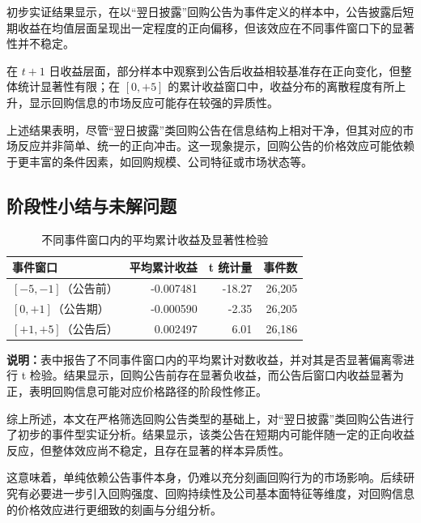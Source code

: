 \documentclass[a4paper,10pt]{article}
\begin{document}
初步实证结果显示，在以“翌日披露”回购公告为事件定义的样本中，公告披露后短期收益在均值层面呈现出一定程度的正向偏移，但该效应在不同事件窗口下的显著性并不稳定。

在 $t+1$ 日收益层面，部分样本中观察到公告后收益相较基准存在正向变化，但整体统计显著性有限；在 $[0,+5]$ 的累计收益窗口中，收益分布的离散程度有所上升，显示回购信息的市场反应可能存在较强的异质性。

上述结果表明，尽管“翌日披露”类回购公告在信息结构上相对干净，但其对应的市场反应并非简单、统一的正向冲击。这一现象提示，回购公告的价格效应可能依赖于更丰富的条件因素，如回购规模、公司特征或市场状态等。


\subsection{阶段性小结与未解问题}

\begin{table}[H]
    \centering
    \caption{不同事件窗口内的平均累计收益及显著性检验}
    \label{tab:event_window_test}
    \renewcommand{\arraystretch}{1.2}
    \begin{tabular}{l r r r}
        \toprule
        \textbf{事件窗口} & 
        \textbf{平均累计收益} & 
        \textbf{t 统计量} & 
        \textbf{事件数} \\
        \midrule
        $[-5,-1]$（公告前） & -0.007481 & -18.27 & 26{,}205 \\
        $[0,+1]$（公告期）  & -0.000590 & -2.35  & 26{,}205 \\
        $[+1,+5]$（公告后） &  0.002497 &  6.01  & 26{,}186 \\
        \bottomrule
    \end{tabular}
    \vspace{0.2cm}
    \begin{flushleft}
        \footnotesize
        \textbf{说明：}表中报告了不同事件窗口内的平均累计对数收益，并对其是否显著偏离零进行 t 检验。结果显示，回购公告前存在显著负收益，而公告后窗口内收益显著为正，表明回购信息可能对应价格路径的阶段性修正。
    \end{flushleft}
\end{table}


综上所述，本文在严格筛选回购公告类型的基础上，对“翌日披露”类回购公告进行了初步的事件型实证分析。结果显示，该类公告在短期内可能伴随一定的正向收益反应，但整体效应尚不稳定，且存在显著的样本异质性。

这意味着，单纯依赖公告事件本身，仍难以充分刻画回购行为的市场影响。后续研究有必要进一步引入回购强度、回购持续性及公司基本面特征等维度，对回购信息的价格效应进行更细致的刻画与分组分析。
\end{document}
